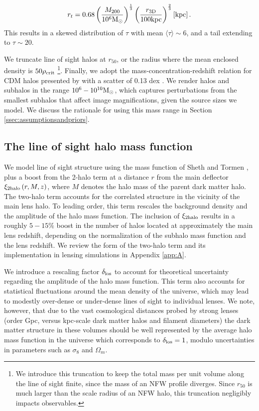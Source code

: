 \begin{equation} \label{eqn:truncrad2}
r_t = 0.68 \left(\frac{M_{200}}{10^6 {\rm{M}_{\odot}}}\right)^{\frac{1}{3}} \left(\frac{r_{\rm{3D}}}{100 \rm{kpc}}\right)^{\frac{2}{3}} \left[\rm{kpc}\right].
\end{equation}
This results in a skewed distribution of $\tau$ with mean $\langle \tau \rangle \sim 6$, and a tail extending to $\tau \sim 20$.

We truncate line of sight halos at $r_{50}$, or the radius where the mean enclosed density is $50 \rho_{\rm{crit}}$ \footnote{We introduce this truncation to keep the total mass per unit volume along the line of sight finite, since the mass of an NFW profile diverges. Since $r_{50}$ is much larger than the scale radius of an NFW halo, this truncation negligibly impacts observables.}. Finally, we adopt the mass-concentration-redshift relation for CDM halos presented by \cite{DiemerJoyce18} with a scatter of 0.13 dex \cite{Dutton++14}. We render halos and subhalos in the range $10^6 - 10^{10} {\rm{M}_{\odot}}$, which captures perturbations from the smallest subhalos that affect image magnifications, given the source sizes we model. We discuss the rationale for using this mass range in Section \ref{ssec:assumptionsandpriors}.

\subsection{The line of sight halo mass function}

We model line of sight structure using the mass function of Sheth and Tormen \cite{ST99}, plus a boost from the 2-halo term at a distance $r$ from the main deflector $\xi_{\rm{2halo}}\left(r,M,z\right)$, where $M$ denotes the halo mass of the parent dark matter halo. The two-halo term accounts for the correlated structure in the vicinity of the main lens halo. To leading order, this term rescales the background density and the amplitude of the halo mass function. The inclusion of $\xi_{\rm{2halo}}$ results in a roughly $5-15 \%$ boost in the number of halos located at approximately the main lens redshift, depending on the normalization of the subhalo mass function and the lens redshift. We review the form of the two-halo term and its implementation in lensing simulations in Appendix \ref{app:A}. 

We introduce a rescaling factor ${\delta_{\rm{los}}}$ to account for theoretical uncertainty regarding the amplitude of the halo mass function. This term also accounts for statistical fluctuations around the mean density of the universe, which may lead to modestly over-dense or under-dense lines of sight to individual lenses. We note, however, that due to the vast cosmological distances probed by strong lenses (order Gpc, versus kpc-scale dark matter halos and filament diameters) the dark matter structure in these volumes should be well represented by the average halo mass function in the universe which corresponds to $\delta_{\rm{los}} = 1$, modulo uncertainties in parameters such as $\sigma_8$ and $\Omega_{m}$.


